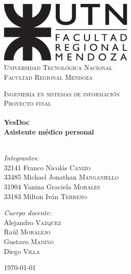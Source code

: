 \begin{titlepage}
\begin{center}

\includegraphics[width=0.5\textwidth]{./img/utn_logo}~\\[1cm]

{
\textsc{\LARGE Universidad Tecnológica Nacional\\
Facultad Regional Mendoza}\\[1.0cm]
}

\textsc{\Large Ingeniería en sistemas de información}\\[0.5cm]

\textsc{\large Proyecto final}\\[0.5cm]

\HRule \\[0.4cm]
{ \Huge \bfseries YesDoc \\[0.2cm] }
{ \LARGE \bfseries Asistente médico personal \\[0.4cm] }
\HRule \\[1.5cm]

\noindent
\begin{minipage}[t]{0.7\textwidth}
\begin{flushleft} \large
\emph{Integrantes:}\\
{\scriptsize 32141} Franco Nicolás \textsc{Canizo}\\
{\scriptsize 33485} Michael Jonathan \textsc{Manganiello}\\
{\scriptsize 31904} Yanina Graciela \textsc{Morales}\\
{\scriptsize 33183} Milton Iván \textsc{Terreno}
\end{flushleft}
\end{minipage}%
\begin{minipage}[t]{0.3\textwidth}
\begin{flushright} \large
\emph{Cuerpo docente:} \\
Alejandro \textsc{Vazquez}\\
Raúl \textsc{Moralejo}\\
Gustavo \textsc{Manino}\\
Diego \textsc{Villa}
\end{flushright}
\end{minipage}

\vfill

{\large \today}

\end{center}
\end{titlepage}
